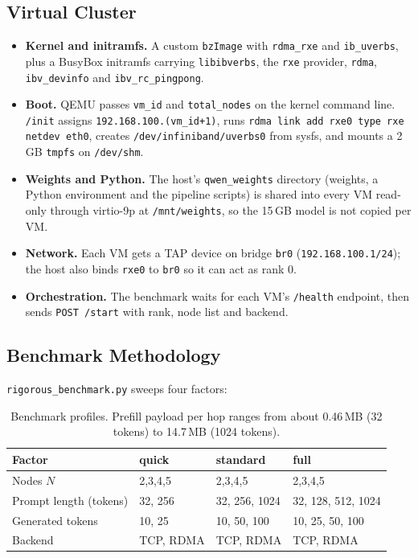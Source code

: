 \documentclass[11pt,a4paper]{article}
\begin{document}
\subsection{Virtual Cluster}
\begin{itemize}[leftmargin=*]
  \item \textbf{Kernel and initramfs.} A custom \texttt{bzImage} with \texttt{rdma\_rxe} and \texttt{ib\_uverbs}, plus a BusyBox initramfs carrying \texttt{libibverbs}, the \texttt{rxe} provider, \texttt{rdma}, \texttt{ibv\_devinfo} and \texttt{ibv\_rc\_pingpong}.
  \item \textbf{Boot.} QEMU passes \texttt{vm\_id} and \texttt{total\_nodes} on the kernel command line. \texttt{/init} assigns \texttt{192.168.100.(vm\_id+1)}, runs \texttt{rdma link add rxe0 type rxe netdev eth0}, creates \texttt{/dev/infiniband/uverbs0} from sysfs, and mounts a 2\,GB \texttt{tmpfs} on \texttt{/dev/shm}.
  \item \textbf{Weights and Python.} The host's \texttt{qwen\_weights} directory (weights, a Python environment and the pipeline scripts) is shared into every VM read-only through virtio-9p at \texttt{/mnt/weights}, so the 15\,GB model is not copied per VM.
  \item \textbf{Network.} Each VM gets a TAP device on bridge \texttt{br0} (\texttt{192.168.100.1/24}); the host also binds \texttt{rxe0} to \texttt{br0} so it can act as rank 0.
  \item \textbf{Orchestration.} The benchmark waits for each VM's \texttt{/health} endpoint, then sends \texttt{POST /start} with rank, node list and backend.
\end{itemize}

\subsection{Benchmark Methodology}
\texttt{rigorous\_benchmark.py} sweeps four factors:
\begin{table}[h]
\centering
\begin{tabular}{@{}llll@{}}
\toprule
Factor & quick & standard & full \\
\midrule
Nodes $N$ & 2,3,4,5 & 2,3,4,5 & 2,3,4,5 \\
Prompt length (tokens) & 32, 256 & 32, 256, 1024 & 32, 128, 512, 1024 \\
Generated tokens & 10, 25 & 10, 50, 100 & 10, 25, 50, 100 \\
Backend & TCP, RDMA & TCP, RDMA & TCP, RDMA \\
\bottomrule
\end{tabular}
\caption{Benchmark profiles. Prefill payload per hop ranges from about 0.46\,MB (32 tokens) to 14.7\,MB (1024 tokens).}
\end{table}
\end{document}
